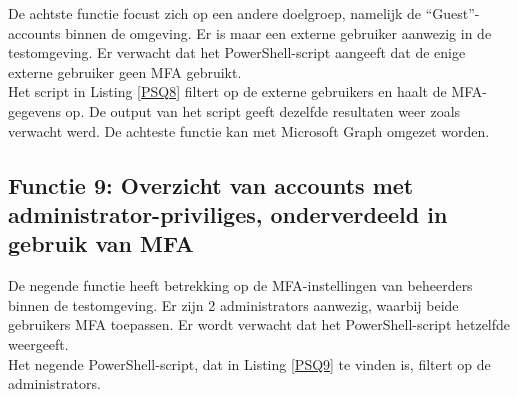 De achtste functie focust zich op een andere doelgroep, namelijk de “Guest”-accounts binnen de omgeving. Er is maar een externe gebruiker aanwezig in de testomgeving. Er verwacht dat het PowerShell-script aangeeft dat de enige externe gebruiker geen \ac{MFA} gebruikt. \\

Het script in Listing \ref{PSQ8} filtert op de externe gebruikers en haalt de \ac{MFA}-gegevens op. De output van het script geeft dezelfde resultaten weer zoals verwacht werd. De achteste functie kan met Microsoft Graph omgezet worden.

\subsection{Functie 9: Overzicht van accounts met administrator-priviliges, onderverdeeld in gebruik van MFA}

De negende functie heeft betrekking op de \ac{MFA}-instellingen van beheerders binnen de testomgeving. Er zijn 2 administrators aanwezig, waarbij beide gebruikers \ac{MFA} toepassen. Er wordt verwacht dat het PowerShell-script hetzelfde weergeeft. \\

Het negende PowerShell-script, dat in Listing \ref{PSQ9} te vinden is, filtert op de administrators. %

